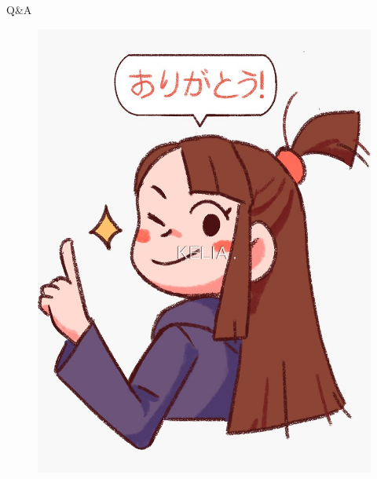 \documentclass[xcolor=dvipsnames, aspectratio=1610]{beamer}
\begin{document}
\section*{}
{
\begin{frame}{Q\&A}
    \begin{figure}[h]
        \centering
        \includegraphics[height=0.85\textheight]{images/6.jpg}
    \end{figure}
\end{frame}
}
\end{document}
